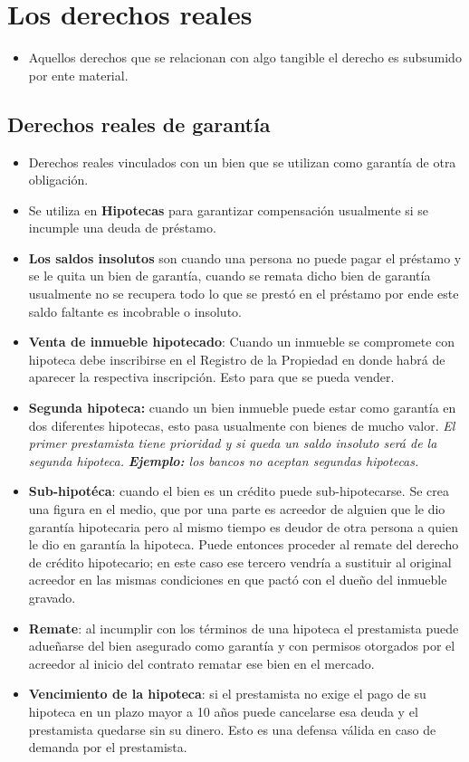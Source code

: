 \documentclass{article}
\begin{document}
\section{Los derechos reales}
\begin{itemize}
    \item Aquellos derechos que se relacionan con algo tangible el derecho es subsumido por ente material.
\end{itemize}

\subsection{Derechos reales de garantía}
\begin{itemize}
    \item Derechos reales vinculados con un bien que se utilizan como garantía de otra obligación.
    \item Se utiliza en \textbf{Hipotecas} para garantizar compensación usualmente si se incumple una deuda de préstamo.
    \item \textbf{Los saldos insolutos} son cuando una persona no puede pagar el préstamo y se le quita un bien de garantía, cuando se remata dicho bien de garantía usualmente no se recupera todo lo que se prestó en el préstamo por ende este saldo faltante es incobrable o insoluto.
    \item \textbf{Venta de inmueble hipotecado}: Cuando un inmueble se compromete con hipoteca debe inscribirse en el Registro de la Propiedad en donde habrá de aparecer la respectiva inscripción. Esto para que se pueda vender.
    \item \textbf{Segunda hipoteca:} cuando un bien inmueble puede estar como garantía en dos diferentes hipotecas, esto pasa usualmente con bienes de mucho valor. \emph{El primer prestamista tiene prioridad y si queda un saldo insoluto será de la segunda hipoteca.} \emph{\textbf{Ejemplo: }los bancos no aceptan segundas hipotecas.}
    \item \textbf{Sub-hipotéca}: cuando el bien es un crédito puede sub-hipotecarse. Se crea una figura en el medio, que por una parte es acreedor de alguien que le dio garantía hipotecaria pero al mismo tiempo es deudor de otra persona a quien le dio en garantía la hipoteca. Puede entonces proceder al remate del derecho de crédito hipotecario; en este caso ese tercero vendría a sustituir al original acreedor en las mismas condiciones en que pactó con el dueño del inmueble gravado.
    \item \textbf{Remate}: al incumplir con los términos de una hipoteca el prestamista puede adueñarse del bien asegurado como garantía y con permisos otorgados por el acreedor al inicio del contrato rematar ese bien en el mercado.
    \item \textbf{Vencimiento de la hipoteca}: si el prestamista no exige el pago de su hipoteca en un plazo mayor a 10 años puede cancelarse esa deuda y el prestamista quedarse sin su dinero. Esto es una defensa válida en caso de demanda por el prestamista.
\end{itemize}
\end{document}

